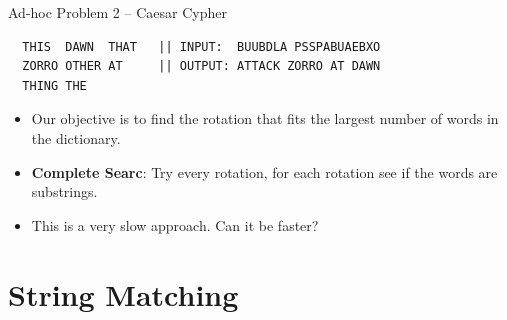 \begin{frame}[fragile]{Ad-hoc Problem 2 -- Caesar Cypher}
\begin{verbatim}
  THIS  DAWN  THAT   || INPUT:  BUUBDLA PSSPABUAEBXO
  ZORRO OTHER AT     || OUTPUT: ATTACK ZORRO AT DAWN
  THING THE
\end{verbatim}

  \begin{itemize}
    \item Our objective is to find the rotation that fits the largest number of words in the dictionary.\bigskip

    \item {\bf Complete Searc}: Try every rotation, for each rotation see if the words are substrings.\bigskip

    \item This is a very slow approach. Can it be faster?
  \end{itemize}
\end{frame}

%
%
%
%


\section{String Matching} %

